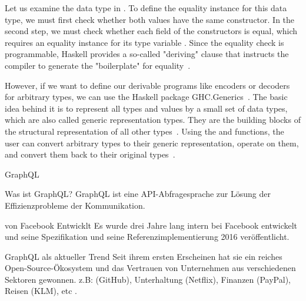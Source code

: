 \begin{frame}
    Let us examine the data type   in . 
    To define the equality instance for this data type, we must first check whether both values have the same constructor. In the second step, we must check whether each field of the constructors is equal, which requires an equality instance for its type variable . Since the equality check is programmable, Haskell provides a so-called "deriving" clause that instructs the compiler to generate the "boilerplate" for equality~\cite{derivable-type-classes, meta-hs}. 
    
    
    However, if we want to define our derivable programs like encoders or decoders for arbitrary types, we can use the Haskell package GHC.Generics~\cite{ghc-generics}. The basic idea behind it is to represent all types and values by a small set of data types, which are also called generic representation types. They are the building blocks of the structural representation of all other types~\cite{optimizing-generics}.
    Using the  and  functions, the user can convert arbitrary types to their generic representation, operate on them, and convert them back to their original types~\cite{optimizing-generics,history-of-haskell, ghc-generics}.

\end{frame}

\begin{frame}{GraphQL}

    \footnotesize

    \begin{block}{Was ist GraphQL?}
        GraphQL ist eine API-Abfragesprache zur Lösung der Effizienzprobleme der Kommunikation\cite{gql-iot}.         
    \end{block}

    \begin{block}{von Facebook Entwicklt}
        Es wurde drei Jahre lang intern bei Facebook entwickelt und seine Spezifikation und seine Referenzimplementierung 2016 veröffentlicht.
        \cite{initial-analysis-of-gql}
    \end{block}

    \begin{block}{GraphQL als aktueller Trend}
        Seit ihrem ersten Erscheinen hat sie ein reiches Open-Source-Ökosystem und das Vertrauen von Unternehmen aus verschiedenen Sektoren gewonnen. z.B: (GitHub), Unterhaltung (Netflix), Finanzen (PayPal), Reisen (KLM), etc \cite{morph-gql-1,gql-healthcare}.
    \end{block}

\end{frame}







